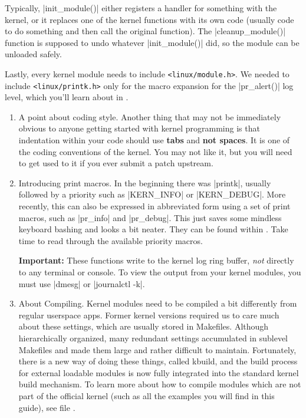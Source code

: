 \documentclass[10pt, oneside]{book}
\begin{document}
Typically, \cpp|init_module()| either registers a handler for something with the kernel, 
or it replaces one of the kernel functions with its own code (usually code to do something and then call the original function).
The \cpp|cleanup_module()| function is supposed to undo whatever \cpp|init_module()| did, so the module can be unloaded safely.

Lastly, every kernel module needs to include \verb|<linux/module.h>|.
We needed to include \verb|<linux/printk.h>| only for the macro expansion for the \cpp|pr_alert()| log level, which you'll learn about in .

\begin{enumerate}
  \item A point about coding style.
        Another thing that may not be immediately obvious to anyone getting started with kernel programming is that indentation within your code should use \textbf{tabs} and \textbf{not spaces}.
        It is one of the coding conventions of the kernel.
        You may not like it, but you will need to get used to it if you ever submit a patch upstream.

  \item Introducing print macros.
  \label{sec:printk}
        In the beginning there was \cpp|printk|, usually followed by a priority such as \cpp|KERN_INFO| or \cpp|KERN_DEBUG|.
        More recently, this can also be expressed in abbreviated form using a set of print macros, such as \cpp|pr_info| and \cpp|pr_debug|.
        This just saves some mindless keyboard bashing and looks a bit neater.
        They can be found within .
        Take time to read through the available priority macros.

        \textbf{Important:} These functions write to the kernel log ring buffer, \emph{not} directly to any terminal or console.
        To view the output from your kernel modules, you must use \sh|dmesg| or \sh|journalctl -k|.

  \item About Compiling.
        Kernel modules need to be compiled a bit differently from regular userspace apps.
        Former kernel versions required us to care much about these settings, which are usually stored in Makefiles.
        Although hierarchically organized, many redundant settings accumulated in sublevel Makefiles and made them large and rather difficult to maintain.
        Fortunately, there is a new way of doing these things, called kbuild, and the build process for external loadable modules is now fully integrated into the standard kernel build mechanism.
        To learn more about how to compile modules which are not part of the official kernel (such as all the examples you will find in this guide), see file .


\end{enumerate}
\end{document}
